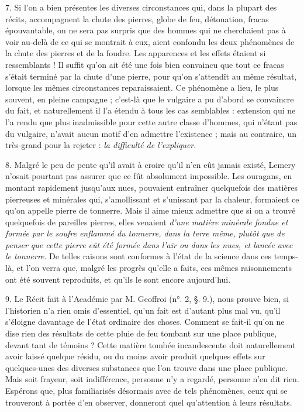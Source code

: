 \documentclass[a4paper, 11pt, oneside, polutonikogreek, french]{article}
\begin{document}
7. Si l'on a bien présentes les diverses circonstances qui, dans la plupart des récits, accompagnent la chute des pierres, globe de feu, détonation, fracas épouvantable, on ne sera pas surpris que des hommes qui ne cherchaient pas à voir au-delà de ce qui se montrait à eux, aient confondu les deux phénomènes de la chute des pierres et de la foudre. Les apparences et les effets étaient si ressemblants ! Il suffit qu'on ait été une fois bien convaincu que tout ce fracas s'était terminé par la chute d'une pierre, pour qu'on s'attendît au même résultat, lorsque les mêmes circonstances reparaissaient. Ce phénomène a lieu, le plus souvent, en pleine campagne ; c'est-là que le vulgaire a pu d'abord se convaincre du fait, et naturellement il l'a étendu à tous les cas semblables : extension qui ne l'a rendu que plus inadmissible pour cette autre classe d'hommes, qui n'étant pas du vulgaire, n'avait aucun motif d'en admettre l'existence ; mais au contraire, un très-grand pour la rejeter : \emph{la difficulté de l'expliquer}.

8. Malgré le peu de pente qu'il avait à croire qu'il n'en eût jamais existé, Lemery n'osait pourtant pas assurer que ce fût absolument impossible. \og Les ouragans, en montant rapidement jusqu'aux nues, pouvaient entraîner quelquefois des matières pierreuses et minérales qui, s'amollissant et s'unissant par la chaleur, formaient ce qu'on appelle pierre de tonnerre. \fg Mais il aime mieux admettre que si on a trouvé quelquefois de pareilles pierres, elles venaient \emph{d'une matière minérale fondue et formée par le soufre enflammé du tonnerre, dans la terre même, plutôt que de penser que cette pierre eût été formée dans l'air ou dans les nues, et lancée avec le tonnerre}. De telles raisons sont conformes à l'état de la science dans ces temps-là, et l'on verra que, malgré les progrès qu'elle a faits, ces mêmes raisonnements ont été souvent reproduits, et qu'ils le sont encore aujourd'hui.

9. Le Récit fait à l'Académie par M. Geoffroi (n°. 2, §. 9.), nous prouve bien, si l'historien n'a rien omis d'essentiel, qu'un fait est d'autant plus mal vu, qu'il s'éloigne davantage de l'état ordinaire des choses. Comment se fait-il qu'on ne dise rien des résultats de cette pluie de feu tombant sur une place publique, devant tant de témoins ? Cette matière tombée incandescente doit naturellement avoir laissé quelque résidu, ou du moins avoir produit quelques effets sur quelques-unes des diverses substances que l'on trouve dans une place publique. Mais soit frayeur, soit indifférence, personne n'y a regardé, personne n'en dit rien. Espérons que, plus familiarisés désormais avec de tels phénomènes, ceux qui se trouveront à portée d'en observer, donneront quel qu’attention à leurs résultats.
\end{document}
